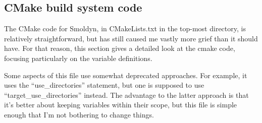 \documentclass {scrbook}
\begin{document}
\subsection{CMake build system code}

The CMake code for Smoldyn, in CMakeLists.txt in the top-most directory, is relatively straightforward, but has still caused me vastly more grief than it should have. For that reason, this section gives a detailed look at the cmake code, focusing particularly on the variable definitions.

Some aspects of this file use somewhat deprecated approaches. For example, it uses the ``use\_directories'' statement, but one is supposed to use ``target\_use\_directories'' instead. The advantage to the latter approach is that it's better about keeping variables within their scope, but this file is simple enough that I'm not bothering to change things.
\end{document}
